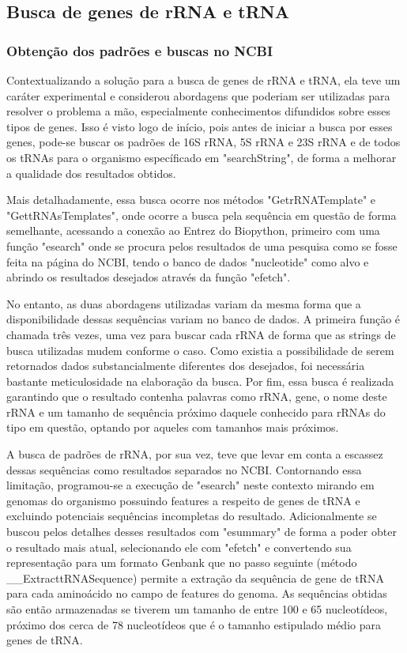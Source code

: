 \documentclass[brazilian,12pt,a4paper,final]{article}
\begin{document}
\subsection{Busca de genes de rRNA e tRNA}
\subsubsection{Obtenção dos padrões e buscas no NCBI}
Contextualizando a solução para a busca de genes de rRNA e tRNA, ela teve um caráter experimental e considerou abordagens que poderiam ser utilizadas para resolver o problema a mão, especialmente conhecimentos difundidos sobre esses tipos de genes. Isso é visto logo de início, pois antes de iniciar a busca por esses genes, pode-se buscar os padrões de 16S rRNA, 5S rRNA e 23S rRNA e de todos os tRNAs para o organismo específicado em "searchString", de forma a melhorar a qualidade dos resultados obtidos. 

\vspace{0.5cm}

Mais detalhadamente, essa busca ocorre nos métodos "GetrRNATemplate" e "GettRNAsTemplates", onde ocorre a busca pela sequência em questão de forma  semelhante, acessando a conexão ao Entrez do Biopython, primeiro com uma função "esearch" onde se procura pelos resultados de uma pesquisa como se fosse feita na página do NCBI, tendo o banco de dados "nucleotide" como alvo e abrindo os resultados desejados através da função "efetch".

\vspace{0.5cm}

No entanto, as duas abordagens utilizadas variam da mesma forma que a disponibilidade dessas sequências variam no banco de dados. A primeira função é chamada três vezes, uma vez para buscar cada rRNA de forma que as strings de busca utilizadas mudem conforme o caso. Como existia a possibilidade de serem retornados dados substancialmente diferentes dos desejados, foi necessária bastante meticulosidade na elaboração da busca. Por fim, essa busca é realizada garantindo que o resultado contenha palavras como rRNA, gene, o nome deste rRNA e um tamanho de sequência próximo daquele conhecido para rRNAs do tipo em questão, optando por aqueles com tamanhos mais próximos.
\\
\vspace{0.5cm}

A busca de padrões de rRNA, por sua vez, teve que levar em conta a escassez dessas sequências como resultados separados no NCBI. Contornando essa limitação, programou-se a execução de "esearch" neste contexto mirando em genomas do organismo possuindo features a respeito de genes de tRNA e excluindo potenciais sequências incompletas do resultado. Adicionalmente se buscou pelos detalhes desses resultados com "esummary" de forma a poder obter o resultado mais atual, selecionando ele com "efetch" e convertendo sua representação para um formato Genbank que no passo seguinte  (método \_\_ExtracttRNASequence) permite a extração da sequência de gene de tRNA para cada aminoácido no campo de features do genoma. As sequências obtidas são então armazenadas se tiverem um tamanho de entre 100 e 65 nucleotídeos, próximo dos cerca de 78 nucleotídeos que é o tamanho estipulado médio para genes de tRNA.
\end{document}
